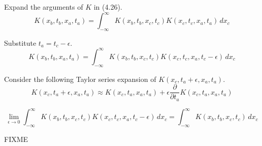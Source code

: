 


\bigskip
Expand the arguments of $K$ in (4.26).
\begin{equation*}
K(x_b,t_b,x_a,t_a)=\int_{-\infty}^\infty K(x_b,t_b,x_c,t_c)K(x_c,t_c,x_a,t_a)\,dx_c
\end{equation*}

Substitute $t_a=t_c-\epsilon$.
\begin{equation*}
K(x_b,t_b,x_a,t_a)=\int_{-\infty}^\infty K(x_b,t_b,x_c,t_c)K(x_c,t_c,x_a,t_c-\epsilon)\,dx_c
\end{equation*}

Consider the following Taylor series expansion of $K(x_c,t_a+\epsilon,x_a,t_a)$.
\begin{equation*}
K(x_c,t_a+\epsilon,x_a,t_a)\approx K(x_c,t_a,x_a,t_a)+\epsilon\frac{\partial}{\partial t_a}K(x_c,t_a,x_a,t_a)
\end{equation*}

\begin{equation*}
\lim_{\epsilon\rightarrow0}\int_{-\infty}^\infty K(x_b,t_b,x_c,t_c)K(x_c,t_c,x_a,t_c-\epsilon)\,dx_c
=\int_{-\infty}^\infty K(x_b,t_b,x_c,t_c)\,dx_c
\end{equation*}

FIXME


